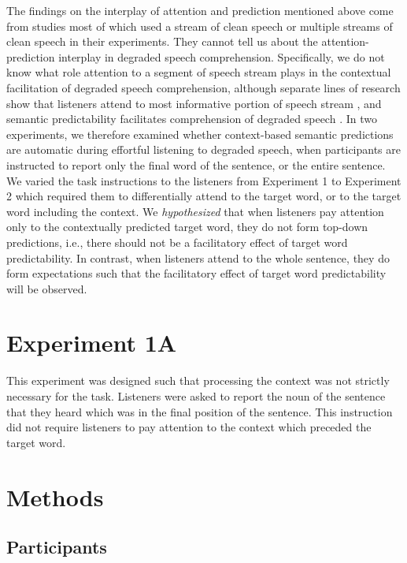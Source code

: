 \documentclass[a4paper, nobind]{templates/ociamthesis}
\begin{document}
The findings on the interplay of attention and prediction mentioned above come from studies most of which used a stream of clean speech or multiple streams of clean speech in their experiments.
They cannot tell us about the attention-prediction interplay in degraded speech comprehension.
Specifically, we do not know what role attention to a segment of speech stream plays in the contextual facilitation of degraded speech comprehension,
although separate lines of research show that listeners attend to most informative portion of speech stream \autocite[e.g.,][]{Astheimer2011}, and semantic predictability facilitates comprehension of degraded speech \autocite[e.g.,][]{Obleser2010}.
In two experiments, we therefore examined whether context-based semantic predictions are automatic during effortful listening to degraded speech, when participants are instructed to report only the final word of the sentence, or the entire sentence.
We varied the task instructions to the listeners from Experiment 1 to Experiment 2 which required them to differentially attend to the target word, or to the target word including the context.
We \emph{hypothesized} that when listeners pay attention only to the contextually predicted target word, they do not form top-down predictions, i.e., there should not be a facilitatory effect of target word predictability.
In contrast, when listeners attend to the whole sentence, they do form expectations such that the facilitatory effect of target word predictability will be observed.

\hypertarget{experiment-1a}{%
\section{Experiment 1A}\label{experiment-1a}}

This experiment was designed such that processing the context was not strictly necessary for the task.
Listeners were asked to report the noun of the sentence that they heard which was in the final position of the sentence.
This instruction did not require listeners to pay attention to the context which preceded the target word.

\hypertarget{methods}{%
\section{Methods}\label{methods}}

\hypertarget{participants}{%
\subsection{Participants}\label{participants}}
\end{document}
